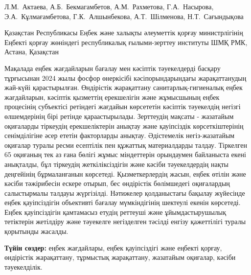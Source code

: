 
\begin{header}

Л.М.~Актаева,
А.Б.~Бекмагамбетов,
А.М.~Рахметова,
Г.А.~Насырова,
Э.А.~Кұлмағамбетова,
Г.К.~Алшынбекова,
А.Т.~Шілменова\envelope,
Н.Т.~Сағындықова
\end{header}

\begin{affil}
Қазақстан Республикасы Еңбек және халықты әлеуметтік қорғау министрлігінің Еңбекті қорғау жөніндегі республикалық ғылыми-зерттеу институты ШМҚ РМК, Астана, Қазақстан

\end{affil}

Мақалада еңбек жағдайларын бағалау мен кәсіптік тәуекелдерді басқару
тұрғысынан 2024 жылы фосфор өнеркісібі кәсіпорындарындағы жарақаттанудың
жай-күйі қарастырылған. Өндірістік жарақаттану санитарлық-гигиеналық
еңбек жағдайларын, кәсіптік қызметтің ерекшелігін және жұмысшының еңбек
процесінің субъектісі ретіндегі жағдайын көрсететін кәсіптік тәуекелдің
негізгі өлшемдерінің бірі ретінде қараастырылады. Зерттеудің мақсаты -
жазатайым оқиғаларды тіркеудің ерекшеліктерін анықтау және қауіпсіздік
көрсеткіштерінің сенімділігіне әсер ететін факторларды анықтау.
Әдістемелік негіз-жазатайым оқиғалар туралы ресми есептілік пен құжаттық
материалдарды талдау. Тіркелген 65 оқиғаның тек аз ғана бөлігі жұмыс
міндеттерін орындаумен байланыста екені анықталды, бұл тіркеудің
жеткіліксіздігін және кәсіби тәуекелдердің нақты деңгейінің
бұрмаланғанын көрсетеді. Қызметкерлердің жасын, еңбек өтілін және кәсіби
тәжірибесін ескере отырып, бес өндірістік бөлімшедегі оқиғалардың
салыстырмалы талдауы жүргізілді. Нәтижелер қолданыстағы бақылау
жүйесінде еңбек қауіпсіздігін объективті бағалау мүмкіндігінің шектеулі
екенін көрсетеді. Еңбек қауіпсіздігін қамтамасыз етудің реттеуші және
ұйымдастырушылық тетіктерін жетілдіру және тәуекелге негізделген тәсілді
енгізу қажеттілігі туралы қорытынды жасалды.

{\bfseries Түйін сөздер:} еңбек жағдайлары, еңбек қауіпсіздігі және еңбекті
қорғау, өндірістік жарақаттану, тұрмыстық жарақаттану, жазатайым
оқиғалар, кәсіби тәуекелділік.

